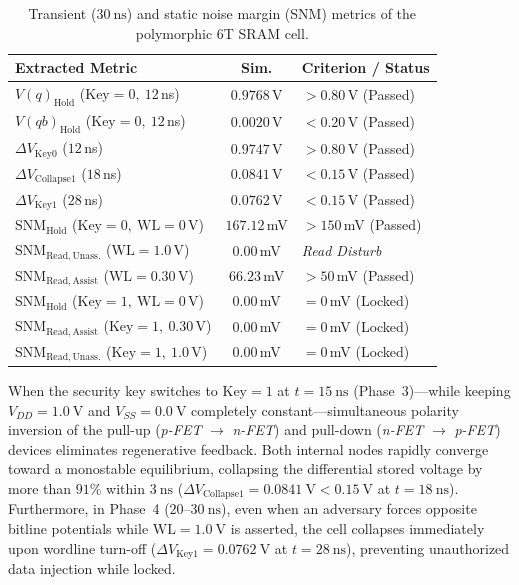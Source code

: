 \documentclass[conference]{IEEEtran}
\begin{document}
\begin{table}[t]
\centering
\caption{Transient ($30\ \text{ns}$) and static noise margin (SNM) metrics of the polymorphic 6T SRAM cell.}
\label{tab:sram_results}
\scriptsize
\setlength{\tabcolsep}{2.5pt}
\begin{tabularx}{\columnwidth}{>{\raggedright\arraybackslash}X c >{\raggedright\arraybackslash}p{2.15cm}}
\toprule
\textbf{Extracted Metric} & \textbf{Sim.} & \textbf{Criterion / Status} \\
\midrule
$V(q)_{\mathrm{Hold}}$ ($\text{Key}=0,\ 12\,$ns) & $0.9768\,$V & $> 0.80\,$V (Passed) \\
$V(qb)_{\mathrm{Hold}}$ ($\text{Key}=0,\ 12\,$ns) & $0.0020\,$V & $< 0.20\,$V (Passed) \\
$\Delta V_{\mathrm{Key0}}$ ($12\,$ns) & $0.9747\,$V & $> 0.80\,$V (Passed) \\
$\Delta V_{\mathrm{Collapse1}}$ ($18\,$ns) & $0.0841\,$V & $< 0.15\,$V (Passed) \\
$\Delta V_{\mathrm{Key1}}$ ($28\,$ns) & $0.0762\,$V & $< 0.15\,$V (Passed) \\
$\mathrm{SNM}_{\mathrm{Hold}}$ ($\text{Key}=0,\ \mathrm{WL}=0\,$V) & $167.12\,$mV & $> 150\,$mV (Passed) \\
$\mathrm{SNM}_{\mathrm{Read,Unass.}}$ ($\mathrm{WL}=1.0\,$V) & $0.00\,$mV & \textit{Read Disturb} \\
$\mathrm{SNM}_{\mathrm{Read,Assist}}$ ($\mathrm{WL}=0.30\,$V) & $66.23\,$mV & $> 50\,$mV (Passed) \\
$\mathrm{SNM}_{\mathrm{Hold}}$ ($\text{Key}=1,\ \mathrm{WL}=0\,$V) & $0.00\,$mV & $= 0\,$mV (Locked) \\
$\mathrm{SNM}_{\mathrm{Read,Assist}}$ ($\text{Key}=1,\ 0.30\,$V) & $0.00\,$mV & $= 0\,$mV (Locked) \\
$\mathrm{SNM}_{\mathrm{Read,Unass.}}$ ($\text{Key}=1,\ 1.0\,$V) & $0.00\,$mV & $= 0\,$mV (Locked) \\
\bottomrule
\end{tabularx}
\end{table}

When the security key switches to $\text{Key}=1$ at $t = 15\ \text{ns}$ (Phase~3)---while keeping $V_{DD} = 1.0\ \text{V}$ and $V_{SS} = 0.0\ \text{V}$ completely constant---simultaneous polarity inversion of the pull-up (\textit{p-FET} $\to$ \textit{n-FET}) and pull-down (\textit{n-FET} $\to$ \textit{p-FET}) devices eliminates regenerative feedback. Both internal nodes rapidly converge toward a monostable equilibrium, collapsing the differential stored voltage by more than $91\%$ within $3\ \text{ns}$ ($\Delta V_{\mathrm{Collapse1}} = 0.0841\ \text{V} < 0.15\ \text{V}$ at $t = 18\ \text{ns}$). Furthermore, in Phase~4 ($20\text{--}30\ \text{ns}$), even when an adversary forces opposite bitline potentials while $\mathrm{WL} = 1.0\ \text{V}$ is asserted, the cell collapses immediately upon wordline turn-off ($\Delta V_{\mathrm{Key1}} = 0.0762\ \text{V}$ at $t = 28\ \text{ns}$), preventing unauthorized data injection while locked.
\end{document}
